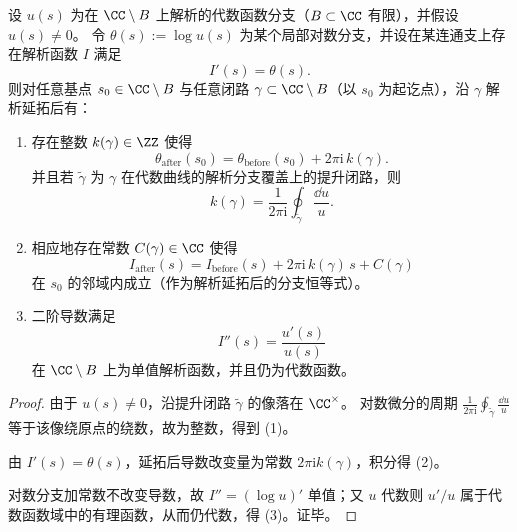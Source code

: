 \begin{theorem}\label{thm:conclusion-algebraic-ldp-monodromy-stokes-quantization}
设 \(u(s)\) 为在 \(\CC\setminus B\) 上解析的代数函数分支（\(B\subset\CC\) 有限），并假设 \(u(s)\neq 0\)。
令 \(\theta(s):=\log u(s)\) 为某个局部对数分支，并设在某连通支上存在解析函数 \(I\) 满足
\[
I'(s)=\theta(s).
\]
则对任意基点 \(s_0\in\CC\setminus B\) 与任意闭路 \(\gamma\subset\CC\setminus B\)（以 \(s_0\) 为起讫点），沿 \(\gamma\) 解析延拓后有：
\begin{enumerate}
  \item 存在整数 \(k(\gamma)\in\ZZ\) 使得
  \[
  \theta_{\mathrm{after}}(s_0)=\theta_{\mathrm{before}}(s_0)+2\pi\mathrm{i}\,k(\gamma).
  \]
  并且若 \(\widetilde\gamma\) 为 \(\gamma\) 在代数曲线的解析分支覆盖上的提升闭路，则
  \[
  k(\gamma)=\frac{1}{2\pi\mathrm{i}}\oint_{\widetilde\gamma}\frac{\dd u}{u}.
  \]
  \item 相应地存在常数 \(C(\gamma)\in\CC\) 使得
  \[
  I_{\mathrm{after}}(s)=I_{\mathrm{before}}(s)+2\pi\mathrm{i}\,k(\gamma)\,s+C(\gamma)
  \]
  在 \(s_0\) 的邻域内成立（作为解析延拓后的分支恒等式）。
  \item 二阶导数满足
  \[
  I''(s)=\frac{u'(s)}{u(s)}
  \]
  在 \(\CC\setminus B\) 上为单值解析函数，并且仍为代数函数。
\end{enumerate}
\end{theorem}
\begin{proof}
由于 \(u(s)\neq 0\)，沿提升闭路 \(\widetilde\gamma\) 的像落在 \(\CC^\times\)。
对数微分的周期
\(
\frac{1}{2\pi\mathrm{i}}\oint_{\widetilde\gamma}\frac{\dd u}{u}
\)
等于该像绕原点的绕数，故为整数，得到 (1)。
\par
由 \(I'(s)=\theta(s)\)，延拓后导数改变量为常数 \(2\pi\mathrm{i}k(\gamma)\)，积分得 (2)。
\par
对数分支加常数不改变导数，故 \(I''=(\log u)'\) 单值；又 \(u\) 代数则 \(u'/u\) 属于代数函数域中的有理函数，从而仍代数，得 (3)。证毕。
\end{proof}


